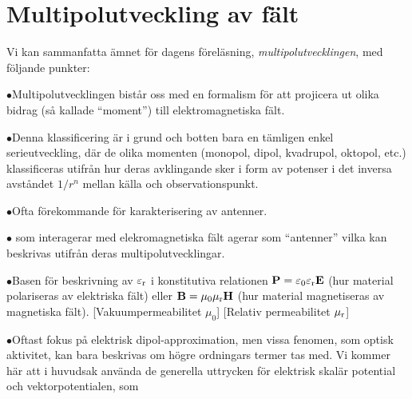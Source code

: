 \section{Multipolutveckling av f{\"a}lt}
Vi kan sammanfatta {\"a}mnet f{\"o}r dagens f{\"o}rel{\"a}sning,
{\it multipolutvecklingen},
med f{\"o}ljande punkter:
\item{$\bullet$}{Multipolutvecklingen bist{\aa}r oss med en formalism f{\"o}r
   att projicera ut olika bidrag (s{\aa} kallade ``moment'') till
   elektromagnetiska f{\"a}lt.}
\item{$\bullet$}{Denna klassificering {\"a}r i grund och botten bara en
   t{\"a}mligen enkel serieutveckling, d{\"a}r de olika momenten (monopol,
   dipol, kvadrupol, oktopol, etc.) klassificeras utifr{\aa}n hur deras
   avklingande sker i form av potenser i det inversa avst{\aa}ndet $1/r^n$
   mellan k{\"a}lla och observationspunkt.}
\item{$\bullet$}{Ofta f{\"o}rekommande f{\"o}r karakterisering av antenner.
                 }
\item{$\bullet$}{ som interagerar med elekromagnetiska f{\"a}lt
   agerar som ``antenner'' vilka kan beskrivas utifr{\aa}n deras
   multipolutvecklingar.}
\item{$\bullet$}{Basen f{\"o}r beskrivning av $\varepsilon_{\rm r}$ i konstitutiva
   relationen ${\bf P}=\varepsilon_0\varepsilon_{\rm r}{\bf E}$ (hur material
   polariseras av elektriska f{\"a}lt) eller ${\bf B}=\mu_0\mu_{\rm r}{\bf H}$
   (hur material magnetiseras av magnetiska f{\"a}lt).
   [Vakuumpermeabilitet $\mu_0$]
   [Relativ permeabilitet $\mu_{\rm r}$]}
\item{$\bullet$}{Oftast fokus p{\aa} elektrisk dipol-approximation, men vissa
   fenomen, som optisk aktivitet, kan bara beskrivas om h{\"o}gre ordningars
   termer tas med.}
\medskip
\noindent
Vi kommer h{\"a}r att i huvudsak anv{\"a}nda de generella uttrycken f{\"o}r
elektrisk skal{\"a}r potential och vektorpotentialen,
som
